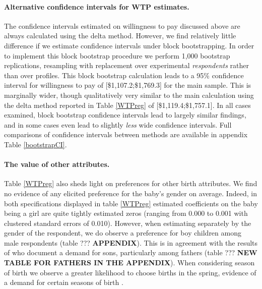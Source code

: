 \documentclass[a4paper, 11pt]{article}
\begin{document}
\begin{spacing}{1.4}
\paragraph{Alternative confidence intervals for WTP estimates.} 
The confidence intervals estimated on willingness to pay discussed
above are always calculated using the delta method.  However, we find
relatively little difference if we estimate confidence intervals under
block bootstrapping.  In order to implement this block bootstrap
procedure we perform 1,000 bootstrap replications, resampling with
replacement over experimental \emph{respondents} rather than over
profiles.  This block bootstrap calculation leads to a 95\% confidence
interval for willingness to pay of [\$1,107.2;\$1,769.3] for the main
sample.  This is marginally wider, though qualitatively very similar to
the main calculation using the delta method reported in Table \ref{WTPreg}
of [\$1,119.4;\$1,757.1].  In all cases examined, block bootstrap confidence
intervals lead to largely similar findings, and in some cases even lead to
slightly \emph{less} wide confidence intervals. Full comparisons of
confidence intervals between methods are available in appendix Table
 \ref{bootstrapCI}.


 \paragraph{The value of other attributes.}
 Table  \ref{WTPreg} also sheds light on preferences for other birth
 attributes. We find no evidence
of any elicited preference for the baby's gender on average.
Indeed, in both specifications displayed in table \ref{WTPreg} estimated coefficients on the baby being a girl are
quite tightly estimated zeros (ranging from 0.000 to 0.001 with clustered
standard errors of 0.010). However, when estimating separately by the gender of the respondent, we do observe a preference for
boy children among male respondents (table ??? \textbf{APPENDIX}). This is in agreement with the results of \citet{DahlMoretti2008} who document a demand
for sons, particularly among fathers (table ??? \textbf{NEW TABLE FOR FATHERS IN THE APPENDIX}).  When considering season of birth we observe a greater likelihood to choose births in the spring, evidence
of a demand for certain seasons of birth \citep{Clarkeetal2016}.



\end{spacing}
\end{document}
